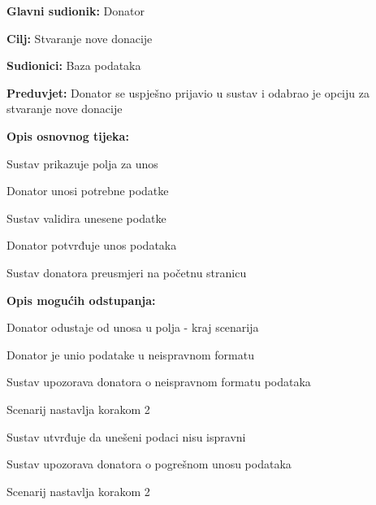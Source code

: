 					\noindent {}
					\begin{packed_item}
	
						\item \textbf{Glavni sudionik: }Donator
						\item  \textbf{Cilj:} Stvaranje nove donacije
						\item  \textbf{Sudionici:} Baza podataka
						\item  \textbf{Preduvjet:} Donator se uspješno prijavio u sustav i odabrao je opciju za stvaranje nove donacije
						\item  \textbf{Opis osnovnog tijeka:}
						
						\item[] \begin{packed_enum}
							\item Sustav prikazuje polja za unos
							\item Donator unosi potrebne podatke
							\item Sustav validira unesene podatke
							\item Donator potvrđuje unos podataka
							\item Sustav donatora preusmjeri na početnu stranicu
						\end{packed_enum}

						\item  \textbf{Opis mogućih odstupanja:}

						\item[] \begin{packed_item}
							\item[2.a] Donator odustaje od unosa u polja - kraj scenarija
							\item[3.a] Donator je unio podatake u neispravnom formatu
							\item[] \begin{packed_enum}
								\item Sustav upozorava donatora o neispravnom formatu podataka
								\item Scenarij nastavlja korakom 2 
							\end{packed_enum}	
							\item[5.a] Sustav utvrđuje da unešeni podaci nisu ispravni
							\item[] \begin{packed_enum}
								\item Sustav upozorava donatora o pogrešnom unosu podataka
								\item Scenarij nastavlja korakom 2 
							\end{packed_enum}					
						\end{packed_item}
					\end{packed_item}
					

